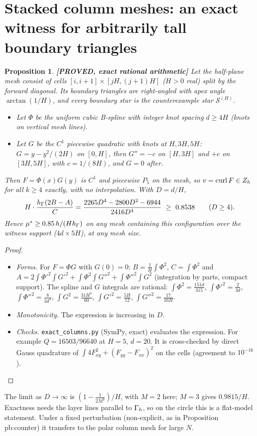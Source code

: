 \documentclass[11pt]{article}
\newtheorem{proposition}[theorem]{Proposition}
\theoremstyle{remark}\newtheorem{remark}[theorem]{Remark}
\newcommand{\lab}[1]{\textbf{[#1]}}
\newcommand{\cS}{\mathcal S}\renewcommand{\div}{\operatorname{div}}
\begin{document}
\section{Stacked column meshes: an exact witness for arbitrarily tall boundary triangles}\label{sec:cols}
\begin{proposition}\label{prop:cols}\lab{PROVED, exact rational arithmetic}
Let the half-plane mesh consist of cells $[i,i+1]\times[jH,(j+1)H]$ ($H>0$ real) split by the forward diagonal. Its boundary
triangles are right-angled with apex angle $\arctan(1/H)$, and every boundary star is the counterexample star $\cS^{(H)}$.
\begin{itemize}
\item Let $\Phi$ be the uniform cubic B-spline with integer knot spacing $d\ge4H$ (knots on vertical mesh lines).
\item Let $G$ be the $C^1$ piecewise quadratic with knots at $H,3H,5H$: $G=y-y^2/(2H)$ on $[0,H]$, then $G''=-c$ on $[H,3H]$ and
  $+c$ on $[3H,5H]$, with $c=1/(8H)$, and $G=0$ after.
\end{itemize}
Then $F=\Phi(x)G(y)$ is $C^1$ and piecewise $P_5$ on the mesh, so $v=\operatorname{curl} F\in Z_h$ for all $k\ge4$ exactly, with no
interpolation. With $D=d/H$,
\[H\cdot\frac{\hG(2B-A)}{C}=\frac{2265D^4-2800D^2-6944}{2416D^4}\ \ge\ 0.8538\qquad(D\ge4).\]
Hence $\mu^\ast\ge0.85\,h/(Hh_\Gamma)$ on any mesh containing this configuration over the witness support ($4d\times5H$), at any
mesh size.
\end{proposition}
\begin{proof}
\begin{itemize}
\item \emph{Forms.} For $F=\Phi G$ with $G(0)=0$: $B=\frac1H\int\Phi^2$, $C=\int\Phi^2$ and
  $A=2\int\Phi'^2\int G'^2+\int\Phi^2\int G''^2+\int\Phi''^2\int G^2$ (integration by parts, compact support). The spline and
  $G$ integrals are rational: $\int\Phi^2=\frac{151d}{315}$, $\int\Phi'^2=\frac2{3d}$, $\int\Phi''^2=\frac8{3d^3}$,
  $\int G^2=\frac{31H^3}{60}$, $\int G'^2=\frac{5H}{12}$, $\int G''^2=\frac{17}{16H}$.
\item \emph{Monotonicity.} The expression is increasing in $D$.
\item \emph{Checks.} \texttt{exact\_columns.py} (SymPy, exact) evaluates the expression. For example $Q=16503/96640$ at
  $H=5$, $d=20$. It is cross-checked by direct Gauss quadrature of $\int4F_{xy}^2+(F_{yy}-F_{xx})^2$ on the cells (agreement to
  $10^{-16}$).\qedhere
\end{itemize}
\end{proof}
The limit as $D\to\infty$ is $(1-\frac1{2M^3})/H$, with $M=2$ here; $M=3$ gives $0.9815/H$. Exactness needs the layer lines
parallel to $\Gamma_h$, so on the circle this is a flat-model statement. Under a fixed perturbation (non-explicit, as in
Proposition pb:counter) it transfers to the polar column mesh for large $N$.
\end{document}
